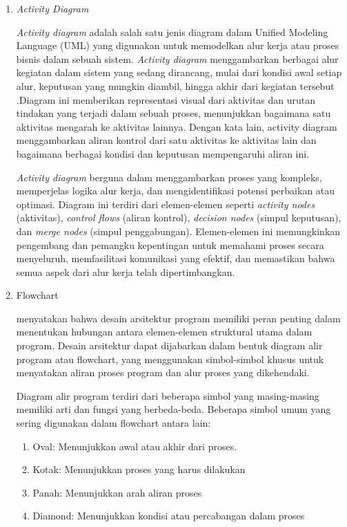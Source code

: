 \begin{enumerate}[leftmargin=1cm, itemindent=0.6cm,labelwidth=15pt, labelsep=5pt, listparindent=1cm,align=left]

    \item \textit{Activity Diagram}

        \textit{Activity diagram} adalah salah satu jenis diagram dalam Unified Modeling Language (UML) yang digunakan untuk memodelkan alur kerja atau proses bisnis dalam sebuah sistem. \textit{Activity diagram} menggambarkan berbagai alur kegiatan dalam sistem yang sedang dirancang, mulai dari kondisi awal setiap alur, keputusan yang mungkin diambil, hingga akhir dari kegiatan tersebut \cite{pratama2021rancang}.Diagram ini memberikan representasi visual dari aktivitas dan urutan tindakan yang terjadi dalam sebuah proses, menunjukkan bagaimana satu aktivitas mengarah ke aktivitas lainnya. Dengan kata lain, activity diagram menggambarkan aliran kontrol dari satu aktivitas ke aktivitas lain dan bagaimana berbagai kondisi dan keputusan mempengaruhi aliran ini.

        \textit{Activity diagram} berguna dalam menggambarkan proses yang kompleks, memperjelas logika alur kerja, dan mengidentifikasi potensi perbaikan atau optimasi. Diagram ini terdiri dari elemen-elemen seperti \textit{activity nodes} (aktivitas), \textit{control flows} (aliran kontrol), \textit{decision nodes} (simpul keputusan), dan \textit{merge nodes} (simpul penggabungan). Elemen-elemen ini memungkinkan pengembang dan pemangku kepentingan untuk memahami proses secara menyeluruh, memfasilitasi komunikasi yang efektif, dan memastikan bahwa semua aspek dari alur kerja telah dipertimbangkan.

	\item Flowchart

	      menyatakan bahwa desain arsitektur program memiliki peran penting dalam menentukan hubungan antara elemen-elemen struktural utama dalam program. Desain arsitektur dapat dijabarkan dalam bentuk diagram alir program atau flowchart, yang menggunakan simbol-simbol khusus untuk menyatakan aliran proses program dan alur proses yang dikehendaki.

	      Diagram alir program terdiri dari beberapa simbol yang masing-masing memiliki arti dan fungsi yang berbeda-beda. Beberapa simbol umum yang sering digunakan dalam flowchart antara lain:

	      \begin{enumerate}
		      \item Oval: Menunjukkan awal atau akhir dari proses.
		      \item Kotak: Menunjukkan proses yang harus dilakukan
		      \item Panah: Menunjukkan arah aliran proses
		      \item Diamond: Menunjukkan kondisi atau percabangan dalam proses
	      \end{enumerate}


\end{enumerate}

